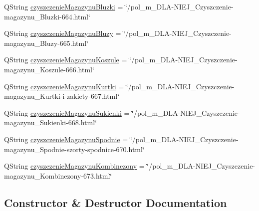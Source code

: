 \begin{DoxyCompactItemize}
\item 
Q\+String \mbox{\hyperlink{classdownload_product_a27df06248bab227942b7ddc59a8bff29}{czyszczenie\+Magazynu\+Bluzki}} = \char`\"{}/pol\+\_\+m\+\_\+\+D\+LA-\/N\+I\+E\+J\+\_\+\+Czyszczenie-\/magazynu\+\_\+\+Bluzki-\/664.html\char`\"{}
\item 
Q\+String \mbox{\hyperlink{classdownload_product_a7c256013654436e4d23e918ead96890c}{czyszczenie\+Magazynu\+Bluzy}} = \char`\"{}/pol\+\_\+m\+\_\+\+D\+LA-\/N\+I\+E\+J\+\_\+\+Czyszczenie-\/magazynu\+\_\+\+Bluzy-\/665.html\char`\"{}
\item 
Q\+String \mbox{\hyperlink{classdownload_product_a908ab8bd3405531dd343be3b7213bdd6}{czyszczenie\+Magazynu\+Koszule}} = \char`\"{}/pol\+\_\+m\+\_\+\+D\+LA-\/N\+I\+E\+J\+\_\+\+Czyszczenie-\/magazynu\+\_\+\+Koszule-\/666.html\char`\"{}
\item 
Q\+String \mbox{\hyperlink{classdownload_product_af58b756efd5c5a4a6199e8d2ba7d8b31}{czyszczenie\+Magazynu\+Kurtki}} = \char`\"{}/pol\+\_\+m\+\_\+\+D\+LA-\/N\+I\+E\+J\+\_\+\+Czyszczenie-\/magazynu\+\_\+\+Kurtki-\/i-\/zakiety-\/667.html\char`\"{}
\item 
Q\+String \mbox{\hyperlink{classdownload_product_a63f8394759cecf56ea150eec87f4c531}{czyszczenie\+Magazynu\+Sukienki}} = \char`\"{}/pol\+\_\+m\+\_\+\+D\+LA-\/N\+I\+E\+J\+\_\+\+Czyszczenie-\/magazynu\+\_\+\+Sukienki-\/668.html\char`\"{}
\item 
Q\+String \mbox{\hyperlink{classdownload_product_aba54625e99b297bacdf3f527081e5275}{czyszczenie\+Magazynu\+Spodnie}} = \char`\"{}/pol\+\_\+m\+\_\+\+D\+LA-\/N\+I\+E\+J\+\_\+\+Czyszczenie-\/magazynu\+\_\+\+Spodnie-\/szorty-\/spodnice-\/670.html\char`\"{}
\item 
Q\+String \mbox{\hyperlink{classdownload_product_a62e74888bda8f994e89e2def31aa78a6}{czyszczenie\+Magazynu\+Kombinezony}} = \char`\"{}/pol\+\_\+m\+\_\+\+D\+LA-\/N\+I\+E\+J\+\_\+\+Czyszczenie-\/magazynu\+\_\+\+Kombinezony-\/673.html\char`\"{}
\end{DoxyCompactItemize}


\subsection{Constructor \& Destructor Documentation}
\mbox{\label{classdownload_product_a0d44eb29a7391d9b4f2412edf7d1ebda}} 
